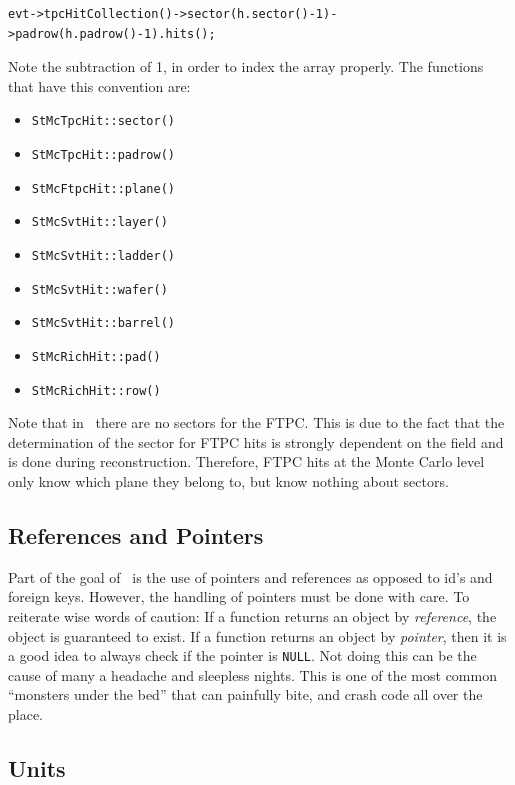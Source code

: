 \begin{verbatim}
evt->tpcHitCollection()->sector(h.sector()-1)->padrow(h.padrow()-1).hits();
\end{verbatim}
Note the subtraction of 1, in order to index the array properly.
The functions that have this convention are:

\begin{itemize}
	\item \texttt{StMcTpcHit::sector()}
	\item \texttt{StMcTpcHit::padrow()}
	\item \texttt{StMcFtpcHit::plane()}
	\item \texttt{StMcSvtHit::layer()}
	\item \texttt{StMcSvtHit::ladder()}
	\item \texttt{StMcSvtHit::wafer()}
	\item \texttt{StMcSvtHit::barrel()}
	\item \texttt{StMcRichHit::pad()}
	\item \texttt{StMcRichHit::row()}
\end{itemize}

Note that in \StMcEvent\ there are no sectors for the FTPC.  This is due to the
fact that the determination of the sector for FTPC hits is strongly dependent
on the field and is done during reconstruction.  Therefore, FTPC hits
at the Monte Carlo level only know which plane they belong to, but know
nothing about sectors.

\subsection {References and Pointers}
Part of the goal of \StMcEvent\ is the use of pointers and references
as opposed to id's and foreign keys.  However, the handling of
pointers must be done with care.
To reiterate wise words of caution: If a function returns an object by {\it reference},
the object is guaranteed to exist.  If a function returns an object by {\it pointer},
then it is a good idea to always check if the pointer is \verb+NULL+. Not doing
this can be the cause of many a headache and sleepless nights.  This is one of
the most common ``monsters under the bed'' that can painfully bite, 
and crash code all over the place.

\subsection{Units}
 
\label{sec:units}

